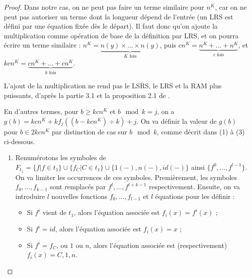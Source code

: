 \begin{proof}
{\begin{minipage}{0.9\textwidth}
					Dans notre cas, on ne peut pas faire un terme similaire pour $n^K$, car on ne peut pas autoriser un terme dont la longueur dépend de l'entrée (un LRS est défini par une équation fixée dès le départ). Il faut donc qu'on ajoute la multiplication comme opération de base de la définition par LRS, et on pourra écrire un terme similaire : $n^K = \underset{K \text{ fois}}{\underbrace{n(y) \times \dots \times n(y)}}$, puis $cn^K = \underset{c \text{ fois}}{\underbrace{n^K + \dots + n^K}}$, et $kcn^K = \underset{k \text{ fois}}{\underbrace{cn^K + \dots + cn^K}}$. 
					
					L'ajout de la multiplication ne rend pas le LSRS, le LRS et la RAM plus puissants, d'après la partie 3.1 et la proposition 2.1 de \cite{GrandjeanSchwentick2002}. 
					
				\end{minipage}
			}
				
				\espace
			
			
			En d'autres termes, pour $b \geqslant kcn^K$ et $b \mod{k} = j$, on a $g(b) = kcn^K + k f_j\left( (b-kcn^K) \div k \right) + j$.
			On va définir la valeur de $g(b)$ pour $b \in 2kcn^K$ par distinction de cas sur $b \mod{k}$, comme décrit dans (1) à (3) ci-dessous.
			
			\begin{enumerate}[itemsep=-1mm,leftmargin=2cm]
				\item  
					Renumérotons les symboles de $F_{t_1} = \{f | f \in t_1\} \cup \{f_C | C \in t_1\} \cup \{1(-), n(-), id(-)\}$ ainsi $\{ f^0, \dots, f^{l-1} \}$. On va limiter les occurrences de ces symboles. Premièrement, les symboles $f_0, \dots, f_{k-1}$ sont remplacés par $f^{l}, \dots, f^{l+k-1}$ respectivement. Ensuite, on va introduire $l$ nouvelles fonctions $f_0, \dots, f_{l-1}$ et $l$ équations pour les définir :
					
						\begin{itemize}[itemsep=-1mm,leftmargin=1cm]
							\item	Si $f^i$ vient de $t_1$, alors l'équation associée est $f_i(x) = f^i(x)$ ;
							\item 	Si $f^i = id$, alors l'équation associée est $f_i(x) = x$ ;
							\item 	Si $f^i = f_C$, ou $1$ ou $n$, alors l'équation associée est (respectivement) $f_i(x) = C, 1, n$. 
						\end{itemize}
				
					

\end{enumerate}
\end{proof}
